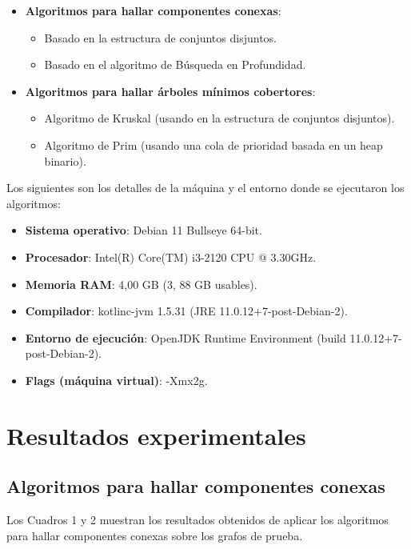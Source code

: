\documentclass[11pt]{article}
\begin{document}
\begin{itemize}
   \item \textbf{Algoritmos para hallar componentes conexas}:
   \begin{itemize}
      \item Basado en la estructura de conjuntos disjuntos.
      \item Basado en el algoritmo de Búsqueda en Profundidad.
   \end{itemize}
   \item \textbf{Algoritmos para hallar árboles mínimos cobertores}:
   \begin{itemize}
      \item Algoritmo de Kruskal (usando en la estructura de conjuntos disjuntos).
      \item Algoritmo de Prim (usando una cola de prioridad basada en un heap binario).
   \end{itemize}
\end{itemize}

Los siguientes son los detalles de la máquina y el entorno donde se ejecutaron los algoritmos:

\begin{itemize}
   \item \textbf{Sistema operativo}: Debian 11 Bullseye 64-bit.
   \item \textbf{Procesador}: Intel(R) Core(TM) i3-2120 CPU @ 3.30GHz.
   \item \textbf{Memoria RAM}: 4,00 GB (3, 88 GB usables).
   \item \textbf{Compilador}: kotlinc-jvm 1.5.31 (JRE 11.0.12+7-post-Debian-2).
   \item \textbf{Entorno de ejecución}: OpenJDK Runtime Environment (build 11.0.12+7-post-Debian-2).
   \item \textbf{Flags (máquina virtual)}: -Xmx2g.
\end{itemize}

\section{Resultados experimentales}

\subsection{Algoritmos para hallar componentes conexas}

Los Cuadros 1 y 2 muestran los resultados obtenidos de aplicar los algoritmos
para hallar componentes conexas sobre los grafos de prueba. \\
\end{document}
